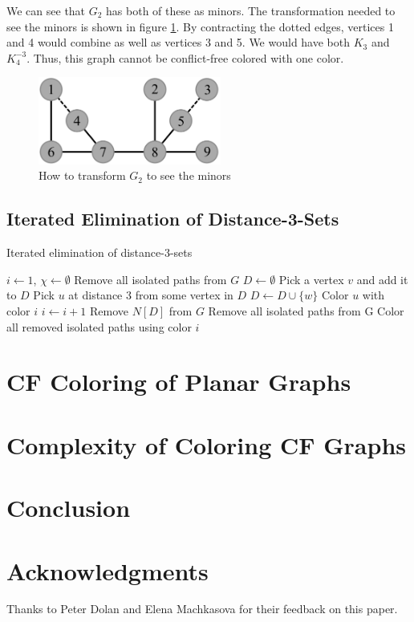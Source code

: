 \documentclass{sig-alternate}
\begin{document}
We can see that $G_2$ has both of these as minors. The transformation needed to see the minors is shown in figure \ref{fig:criterion-minor}. By contracting the dotted edges, vertices 1 and 4 would combine as well as vertices 3 and 5. We would have both $K_{3}$ and $K_{4}^{-3}$. Thus, this graph cannot be conflict-free colored with one color.

\begin{figure}[h]
	\centering
	\includegraphics[width=6cm]{../figures/criterion-minor.pdf}
	\caption{How to transform $G_2$ to see the minors}\label{fig:criterion-minor}
\end{figure}

\subsection{Iterated Elimination of Distance-3-Sets}

\begin{algorithm}
\caption{Iterated elimination of distance-3-sets} \label{alg:elimination}
\begin{algorithmic}[1]
\State $i \gets 1$, $\chi \gets \emptyset$
\State Remove all isolated paths from $G$
	\State $D \gets \emptyset$
		\State Pick a vertex $v$ and add it to $D$
			\State Pick $u$ at distance 3 from some vertex in $D$
			\State $D \gets D \cup \{ w \}$
		\EndWhile
			\State Color $u$ with color $i$
		\EndFor
		\State $i \gets i + 1$
		\State Remove $N[D]$ from $G$
		\State Remove all isolated paths from G
	\EndFor
\EndWhile
\State Color all removed isolated paths using color $i$
\end{algorithmic}
\end{algorithm}

\section{CF Coloring of Planar Graphs}


\section{Complexity of Coloring CF Graphs}



\section{Conclusion}
\label{sec:conclusion}

\section{Acknowledgments}
Thanks to Peter Dolan and Elena Machkasova for their feedback on this paper.



\end{document}
